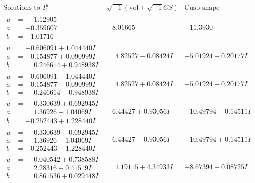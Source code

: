 \documentclass[1p]{elsarticle_modified}
\theoremstyle{definition}
\newcommand{\I}{\sqrt{-1}}
\begin{document}
$$\begin{array}{c|c|c}  
\text{Solutions to }I^u_{1}& \I (\text{vol} + \sqrt{-1}CS) & \text{Cusp shape}\\
 \hline 
\begin{aligned}
u &= \phantom{-}1.12905\phantom{ +0.000000I} \\
a &= -0.359607\phantom{ +0.000000I} \\
b &= -1.01716\phantom{ +0.000000I}\end{aligned}
 & -8.01665\phantom{ +0.000000I} & -11.3930\phantom{ +0.000000I} \\ \hline\begin{aligned}
u &= -0.606091 + 1.044440 I \\
a &= -0.154877 + 0.090999 I \\
b &= \phantom{-}0.246614 + 0.948938 I\end{aligned}
 & \phantom{-}4.82527 - 0.08424 I & -5.01924 - 0.20177 I \\ \hline\begin{aligned}
u &= -0.606091 - 1.044440 I \\
a &= -0.154877 - 0.090999 I \\
b &= \phantom{-}0.246614 - 0.948938 I\end{aligned}
 & \phantom{-}4.82527 + 0.08424 I & -5.01924 + 0.20177 I \\ \hline\begin{aligned}
u &= \phantom{-}0.330639 + 0.692945 I \\
a &= \phantom{-}1.36926 + 1.04069 I \\
b &= -0.252443 + 1.228440 I\end{aligned}
 & -6.44427 + 0.93056 I & -10.49794 - 0.14511 I \\ \hline\begin{aligned}
u &= \phantom{-}0.330639 - 0.692945 I \\
a &= \phantom{-}1.36926 - 1.04069 I \\
b &= -0.252443 - 1.228440 I\end{aligned}
 & -6.44427 - 0.93056 I & -10.49794 + 0.14511 I \\ \hline\begin{aligned}
u &= \phantom{-}0.040542 + 0.738588 I \\
a &= \phantom{-}2.28316 - 0.41519 I \\
b &= \phantom{-}0.861536 + 0.029448 I\end{aligned}
 & \phantom{-}1.19115 + 4.34933 I & -8.67394 + 0.08725 I \\ \hline\begin{aligned}

\end{aligned}
\end{array}$$
\end{document}
